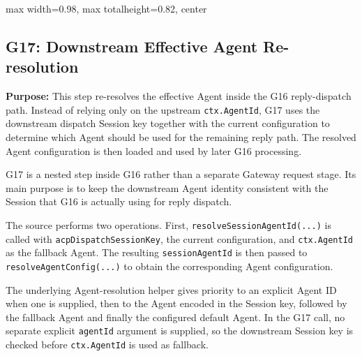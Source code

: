 \begin{center}
\begin{adjustbox}{
max width=0.98\textwidth,
max totalheight=0.82\textheight,
center
}

\end{adjustbox}

\end{center}


\subsection*{G17: Downstream Effective Agent Re-resolution}

\textbf{Purpose:}
This step re-resolves the effective Agent inside the G16 reply-dispatch
path. Instead of relying only on the upstream \texttt{ctx.AgentId},
G17 uses the downstream dispatch Session key together with the current
configuration to determine which Agent should be used for the remaining
reply path. The resolved Agent configuration is then loaded and used by
later G16 processing.

G17 is a nested step inside G16 rather than a separate Gateway request
stage. Its main purpose is to keep the downstream Agent identity
consistent with the Session that G16 is actually using for reply
dispatch.

The source performs two operations. First,
\texttt{resolveSessionAgentId(...)} is called with
\texttt{acpDispatchSessionKey}, the current configuration, and
\texttt{ctx.AgentId} as the fallback Agent. The resulting
\texttt{sessionAgentId} is then passed to
\texttt{resolveAgentConfig(...)} to obtain the corresponding Agent
configuration.

The underlying Agent-resolution helper gives priority to an explicit
Agent ID when one is supplied, then to the Agent encoded in the Session
key, followed by the fallback Agent and finally the configured default
Agent. In the G17 call, no separate explicit \texttt{agentId} argument
is supplied, so the downstream Session key is checked before
\texttt{ctx.AgentId} is used as fallback.

